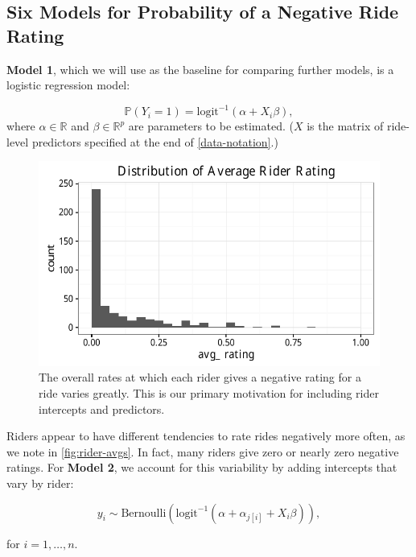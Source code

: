 \documentclass[]{article}
\begin{document}
\subsection{Six Models for Probability of a Negative Ride
Rating}\label{ride-models}

\textbf{Model 1}, which we will use as the baseline for comparing
further models, is a logistic regression model:

\[ \mathbb{P} (Y_i=1) = \text{logit}^{-1} (\alpha + X_i \beta),\] where
\(\alpha \in \mathbb{R}\) and \(\beta \in \mathbb{R}^p\) are parameters
to be estimated. (\(X\) is the matrix of ride-level predictors specified
at the end of \autoref{data-notation}.)

\begin{figure}[tbh]
\centering
\includegraphics[angle = 0,scale = 1]{figure/rider_avgs.pdf}
\caption[Distribution of Average Rider Rating]{\normalsize{The overall rates at which each rider gives a negative rating for a
ride varies greatly. This is our primary motivation for including rider intercepts
and predictors.}}
\label{fig:rider-avgs}
\end{figure}

Riders appear to have different tendencies to rate rides negatively more
often, as we note in \autoref{fig:rider-avgs}. In fact, many riders give
zero or nearly zero negative ratings. For \textbf{Model 2}, we account
for this variability by adding intercepts that vary by rider:

\begin{equation}
y_i \sim \text{Bernoulli} \left(
\text{logit}^{-1} \left( \alpha + \alpha_{j[i]} + X_i \beta \right)
\right),
\end{equation}

for \(i = 1, \ldots, n\).
\end{document}
